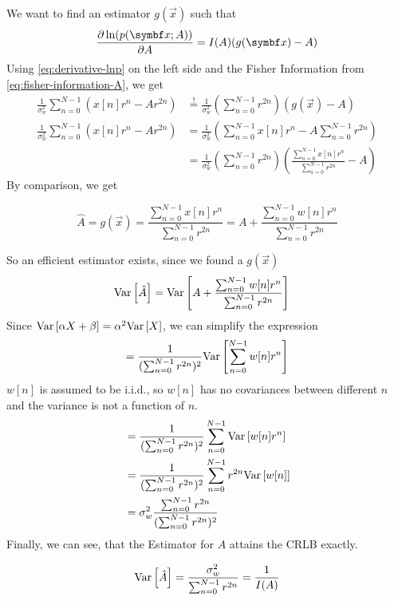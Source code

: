 We want to find an estimator $g(\vec{x})$ such that
\begin{equation}
    \pd[\ln(p(\vec{x};A))]{A}=I(A)(g(\vec{x})-A)
\end{equation}
Using \autoref{eq:derivative-lnp} on the left side and the Fisher Information from \autoref{eq:fisher-information-A}, we get
\begin{align*}
\frac{1}{\sigma_w^2}\sum_{n=0}^{N-1} \left(x[n]r^n - Ar^{2n}\right)
    &\overset{!}{=} \frac{1}{\sigma_w^2}\left(\sum_{n=0}^{N-1} r^{2n}\right)(g(\vec{x})-A) \\
\frac{1}{\sigma_w^2}\sum_{n=0}^{N-1} \left(x[n]r^n - Ar^{2n}\right) 
    &= \frac{1}{\sigma_w^2}\left(\sum_{n=0}^{N-1} x[n]r^n - A\sum_{n=0}^{N-1} r^{2n}\right) \\
    &= \frac{1}{\sigma_w^2}\left(\sum_{n=0}^{N-1} r^{2n}\right)\left(\frac{\sum_{n=0}^{N-1}x[n]r^n}{\sum_{n=0}^{N-1} r^{2n}}  - A\right)
\end{align*}
By comparison, we get
\begin{boxed-block}
\begin{equation}
    \hat A = g(\vec{x}) = \frac{\sum_{n=0}^{N-1} x[n]r^n}{\sum_{n=0}^{N-1} r^{2n}}
    = A + \frac{\sum_{n=0}^{N-1}w[n]r^n}{\sum_{n=0}^{N-1} r^{2n}}
\end{equation}
\end{boxed-block}
So an efficient estimator exists, since we found a $g(\vec{x})$
\begin{align*}
    \mathrm{Var}\left[\hat A\right]
    &= \mathrm{Var}\left[A + \frac{\sum_{n=0}^{N-1}w[n]r^n}{\sum_{n=0}^{N-1} r^{2n}}\right]
\end{align*}
Since $\mathrm{Var}\left[\alpha X + \beta\right] = \alpha^2\mathrm{Var}\left[X\right]$, we can simplify the expression
\begin{align*}
    = \frac{1}{(\sum_{n=0}^{N-1} r^{2n})^2} \mathrm{Var}\left[\sum_{n=0}^{N-1}w[n]r^n \right]
\end{align*}
$w[n]$ is assumed to be \acs{i.i.d.}, so $w[n]$ has no covariances between different $n$ and the variance is not a function of $n$.
\begin{align*}
    &= \frac{1}{(\sum_{n=0}^{N-1} r^{2n})^2} \sum_{n=0}^{N-1} \mathrm{Var}\left[w[n]r^{n}\right] \\
    &= \frac{1}{(\sum_{n=0}^{N-1} r^{2n})^2} \sum_{n=0}^{N-1} r^{2n}\mathrm{Var}\left[w[n]\right] \\
    &= \sigma_w^2\frac{\sum_{n=0}^{N-1} r^{2n}}{(\sum_{n=0}^{N-1} r^{2n})^2}
\end{align*}
Finally, we can see, that the Estimator for $A$ attains the CRLB exactly.
\begin{boxed-block}
\begin{equation}
    \mathrm{Var}\left[\hat A\right] = \frac{\sigma_w^2}{\sum_{n=0}^{N-1} r^{2n}}
    = \frac{1}{I(A)}
\end{equation}
\end{boxed-block}

